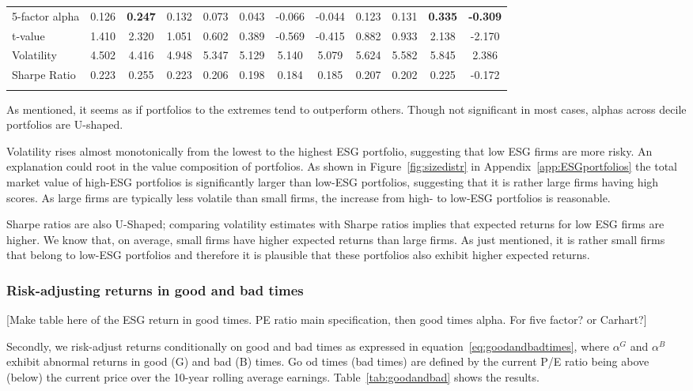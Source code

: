 \documentclass[11pt]{article}
\begin{document}
\begin{table}[!htbp]
{\begin{tabular}{@{\extracolsep{5pt}} lccccccccccc}
			5-factor alpha & 0.126 & \textbf{0.247} & 0.132 & 0.073 & 0.043 & -0.066 & -0.044 & 0.123 & 0.131 &\textbf{0.335} & \textbf{-0.309} \\ 
			t-value & 1.410 & 2.320 & 1.051 & 0.602 & 0.389 & -0.569 & -0.415 & 0.882 & 0.933 & 2.138 & -2.170 \\[2.5ex] 
			
			Volatility & 4.502 & 4.416 & 4.948 & 5.347 & 5.129 & 5.140 & 5.079 & 5.624 & 5.582 & 5.845 & 2.386 \\ 
			Sharpe Ratio & 0.223 & 0.255 & 0.223 & 0.206 & 0.198 & 0.184 & 0.185 & 0.207 & 0.202 & 0.225 & -0.172 \\ 
			\hline \\[-1.8ex] 
	\end{tabular}}
\end{table} 

As mentioned, it seems as if portfolios to the extremes tend to outperform others. Though not significant in most cases, alphas  across decile portfolios are U-shaped. 

Volatility rises almost monotonically from the lowest to the highest ESG portfolio, suggesting that low ESG firms are more risky. An explanation could root in the value composition of portfolios. As shown in Figure~\ref{fig:sizedistr} in Appendix~\ref{app:ESGportfolios} the total market value of high-ESG portfolios is significantly larger than low-ESG portfolios, suggesting that it is rather large firms having high scores. As large firms are typically less volatile than small firms, the increase from high- to low-ESG portfolios is reasonable.

Sharpe ratios are also U-Shaped; comparing volatility estimates with Sharpe ratios implies that expected returns for low ESG firms are higher. We know that, on average, small firms have higher expected returns than large firms. As just mentioned, it is rather small firms that belong to low-ESG portfolios and therefore it is plausible that these portfolios also exhibit higher expected returns. 



\subsubsection{Risk-adjusting returns in good and bad times}

[Make table here of the ESG return in good times. PE ratio main specification, then good times alpha. For five factor? or Carhart?]

Secondly, we risk-adjust returns conditionally on good and bad times as expressed in equation~\eqref{eq:goodandbadtimes}, where $\alpha^G$ and $\alpha^B$ exhibit abnormal returns in good (G) and bad (B) times. Go od times (bad times) are defined by the current P/E ratio being above (below) the current price over the 10-year rolling average earnings. Table~\ref{tab:goodandbad} shows the results. 
\end{document}
